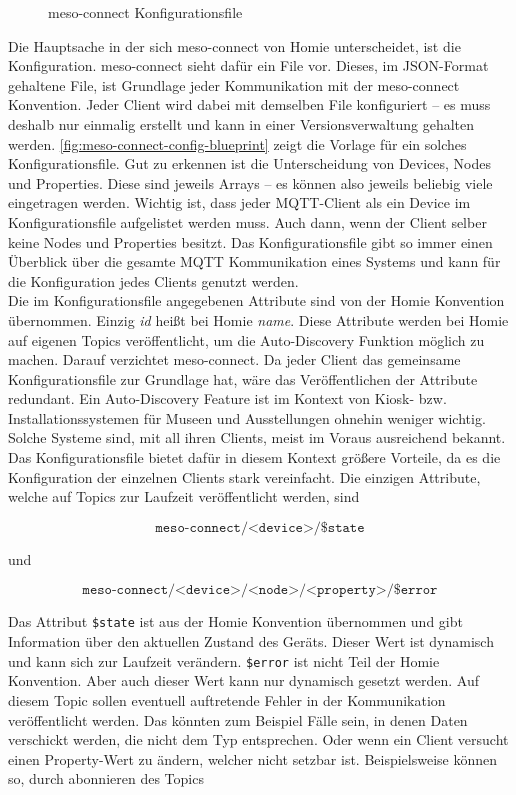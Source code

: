 \begin{figure}
  
  \caption{meso-connect Konfigurationsfile}
  \label{fig:meso-connect-config-blueprint}
\end{figure}

Die Hauptsache in der sich meso-connect von Homie unterscheidet, ist die Konfiguration. meso-connect
sieht dafür ein File vor. Dieses, im JSON-Format gehaltene File, ist Grundlage jeder Kommunikation
mit der meso-connect Konvention. Jeder Client wird dabei mit demselben File konfiguriert -- es muss 
deshalb nur einmalig erstellt und kann in einer Versionsverwaltung gehalten werden. 
\autoref{fig:meso-connect-config-blueprint} zeigt die Vorlage für ein solches Konfigurationsfile. 
Gut zu erkennen ist die Unterscheidung von Devices, Nodes und Properties. Diese sind jeweils Arrays --
es können also jeweils beliebig viele eingetragen werden. Wichtig ist, dass jeder MQTT-Client als ein
Device im Konfigurationsfile aufgelistet werden muss. Auch dann, wenn der Client selber 
keine Nodes und Properties besitzt. Das Konfigurationsfile gibt so immer einen Überblick über die 
gesamte MQTT Kommunikation eines Systems und kann für die Konfiguration jedes Clients genutzt werden.\\
Die im Konfigurationsfile angegebenen Attribute sind von der Homie Konvention übernommen. Einzig \emph{id} heißt
bei Homie \emph{name}. Diese Attribute werden bei Homie auf eigenen Topics veröffentlicht, um die 
Auto-Discovery Funktion möglich zu machen. Darauf verzichtet meso-connect. Da jeder Client das gemeinsame
Konfigurationsfile zur Grundlage hat, wäre das Veröffentlichen der Attribute redundant. Ein Auto-Discovery
Feature ist im Kontext von Kiosk- bzw. Installationssystemen für Museen und Ausstellungen ohnehin weniger wichtig.
Solche Systeme sind, mit all ihren Clients, meist im Voraus ausreichend bekannt. Das Konfigurationsfile
bietet dafür in diesem Kontext größere Vorteile, da es die Konfiguration der einzelnen Clients stark
vereinfacht. Die einzigen Attribute, welche auf Topics zur Laufzeit veröffentlicht 
werden, sind

\[\texttt{meso-connect/<device>/\$state} \]

und

\[\texttt{meso-connect/<device>/<node>/<property>/\$error} \]

Das Attribut \texttt{\$state} ist aus der Homie Konvention übernommen und gibt Information über den aktuellen
Zustand des Geräts. Dieser Wert ist dynamisch und kann sich zur Laufzeit verändern. \texttt{\$error} ist nicht 
Teil der Homie Konvention. Aber auch dieser Wert kann nur dynamisch gesetzt werden.
Auf diesem Topic sollen eventuell auftretende Fehler in der Kommunikation veröffentlicht
werden. Das könnten zum Beispiel Fälle sein, in denen Daten verschickt werden, die nicht dem Typ entsprechen.
Oder wenn ein Client versucht einen Property-Wert zu ändern, welcher nicht setzbar ist. Beispielsweise können so,
durch abonnieren des Topics


